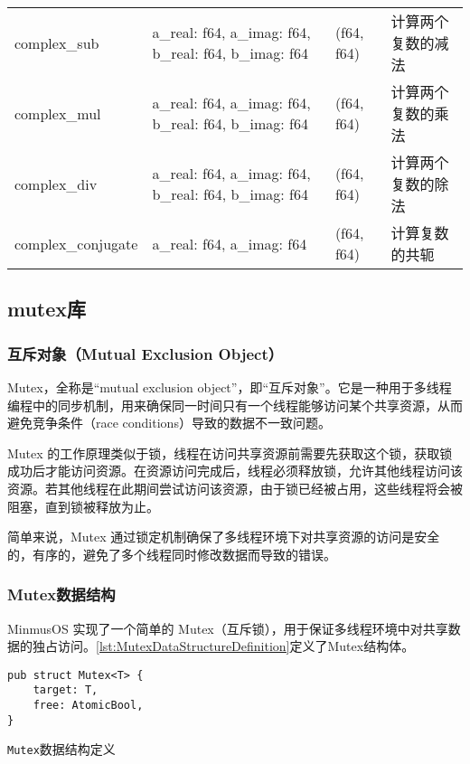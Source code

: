 \begin{longtable}[c]{@{}llll@{}}
    complex\_sub       & a\_real: f64, a\_imag: f64, b\_real: f64, b\_imag: f64 & (f64, f64)  & 计算两个复数的减法      \\
    complex\_mul       & a\_real: f64, a\_imag: f64, b\_real: f64, b\_imag: f64 & (f64, f64)  & 计算两个复数的乘法      \\
    complex\_div       & a\_real: f64, a\_imag: f64, b\_real: f64, b\_imag: f64 & (f64, f64)  & 计算两个复数的除法      \\
    complex\_conjugate & a\_real: f64, a\_imag: f64                             & (f64, f64)  & 计算复数的共轭        \\ \bottomrule
\end{longtable}

\subsection{mutex库}

\subsubsection{互斥对象（Mutual Exclusion Object）}

Mutex，全称是“mutual exclusion object”，即“互斥对象”。它是一种用于多线程编程中的同步机制，用来确保同一时间只有一个线程能够访问某个共享资源，从而避免竞争条件（race conditions）导致的数据不一致问题。

Mutex 的工作原理类似于锁，线程在访问共享资源前需要先获取这个锁，获取锁成功后才能访问资源。在资源访问完成后，线程必须释放锁，允许其他线程访问该资源。若其他线程在此期间尝试访问该资源，由于锁已经被占用，这些线程将会被阻塞，直到锁被释放为止。

简单来说，Mutex 通过锁定机制确保了多线程环境下对共享资源的访问是安全的，有序的，避免了多个线程同时修改数据而导致的错误。

\subsubsection{Mutex数据结构}

MinmusOS 实现了一个简单的 Mutex（互斥锁），用于保证多线程环境中对共享数据的独占访问。\cref{lst:MutexDataStructureDefinition}定义了Mutex结构体。

\begin{listing}[htbp]
    \begin{verbatim}
pub struct Mutex<T> {
    target: T,
    free: AtomicBool,
}
    \end{verbatim}
    \caption{\texttt{Mutex}数据结构定义}\label{lst:MutexDataStructureDefinition}
\end{listing}

